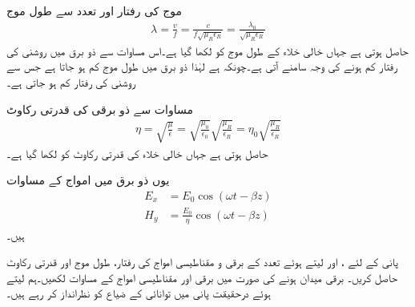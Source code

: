 موج کی رفتار اور تعدد سے طول موج
\begin{align}
\lambda=\frac{v}{f}=\frac{c}{f \sqrt{\mu_R \epsilon_R}}=\frac{\lambda_0}{\sqrt{\mu_R \epsilon_R}}
\end{align}
حاصل ہوتی ہے جہاں خالی خلاء کے طول موج کو  لکھا گیا ہے۔اس مساوات سے ذو برق میں روشنی کی رفتار کم ہونے کی وجہ سامنے آتی ہے۔چونکہ  ہے لہٰذا ذو برق میں طول موج کم ہو جاتا ہے جس سے روشنی کی رفتار کم ہو جاتی ہے۔


مساوات  سے ذو برقی کی  قدرتی رکاوٹ
\begin{align*}
\eta =\sqrt{\frac{\mu}{\epsilon}}=\sqrt{\frac{\mu_0}{\epsilon_0}}\sqrt{\frac{\mu_R}{\epsilon_R}}= \eta_0 \sqrt{\frac{\mu_R}{\epsilon_R}}
\end{align*}
حاصل ہوتی ہے جہاں خالی خلاء کی قدرتی رکاوٹ کو  لکھا گیا ہے۔

یوں ذو برق میں امواج کے مساوات
\begin{align}
E_x&=E_0 \cos (\omega t -\beta z)\\
H_y&=\frac{E_0}{\eta} \cos (\omega t -\beta z)
\end{align}
ہیں۔

پانی کے لئے ،  اور  لیتے ہوئے  تعدد کے برقی و مقناطیسی امواج کی رفتار، طول موج اور قدرتی رکاوٹ حاصل کریں۔ برقی میدان  ہونے کی صورت میں برقی اور مقناطیسی امواج کے مساوات لکھیں۔ہم  لیتے ہوئے درحقیقت پانی میں توانائی کے ضیاع کو نظرانداز کر رہے ہیں۔

